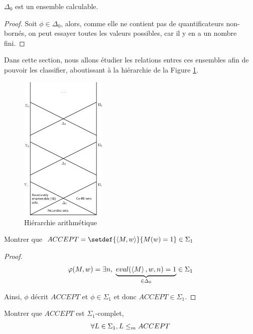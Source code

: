 \begin{prop}
	$\Delta_0$ est un ensemble calculable.
\end{prop}

\begin{proof}
	Soit $\phi \in \Delta_0$, alors, comme elle ne contient pas de quantificateurs non-bornés, on peut essayer toutes les valeurs possibles, car il y en a un nombre
	fini.
\end{proof}


Dans cette section, nous allons étudier les relations entres ces ensembles afin de pouvoir les classifier, aboutissant à la hiérarchie de la Figure \ref{fig:arith-hier}.


\begin{figure}[h]
	\begin{center}
		\includegraphics[height=7cm]{./images/Arithmetic_hierarchy.png}
	\end{center}
	\caption{Hiérarchie arithmétique}
	\label{fig:arith-hier}
\end{figure}


\begin{exercice}
	Montrer que $ACCEPT = \setdef {\encode {M,w}} {M(w) = 1} \in \Sigma_1$
\end{exercice}

\begin{proof}
	$$\varphi (M,w) =  \exists n, \ \underbrace{eval(\left\langle M\right\rangle, w, n) = 1}_{\in \Delta_0} \in \Sigma_1$$

	Ainsi, $\phi$ décrit $ACCEPT$ et $\phi \in \Sigma_1$ et donc $ACCEPT \in \Sigma_1$.
\end{proof}


\begin{exercice}
	Montrer que $ACCEPT$ est $\Sigma_1$-complet, \ie
	$$ \forall L \in \Sigma_1, L \leq_m ACCEPT $$
\end{exercice}

